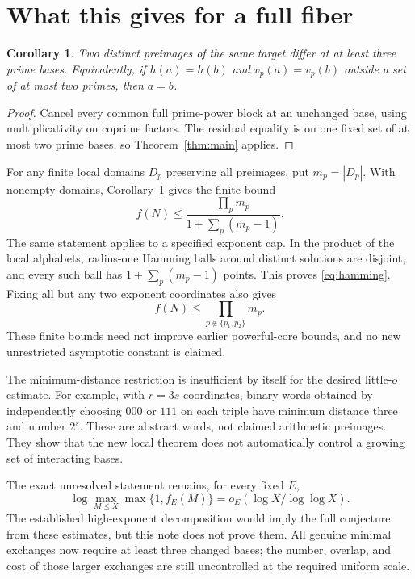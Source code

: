 \documentclass[11pt]{article}
\newtheorem{corollary}[theorem]{Corollary}
\begin{document}
\section{What this gives for a full fiber}
\begin{corollary}\label{cor:distance}
Two distinct preimages of the same target differ at at least three prime bases. Equivalently, if $h(a)=h(b)$ and $v_p(a)=v_p(b)$ outside a set of at most two primes, then $a=b$.
\end{corollary}
\begin{proof}
Cancel every common full prime-power block at an unchanged base, using multiplicativity on coprime factors. The residual equality is on one fixed set of at most two prime bases, so Theorem~\ref{thm:main} applies.
\end{proof}

For any finite local domains $D_p$ preserving all preimages, put $m_p=|D_p|$. With nonempty domains, Corollary~\ref{cor:distance} gives the finite bound
\begin{equation}\label{eq:hamming}
 \boxed{f(N)\le\frac{\prod_p m_p}{1+\sum_p(m_p-1)}.}
\end{equation}
The same statement applies to a specified exponent cap. In the product of the local alphabets, radius-one Hamming balls around distinct solutions are disjoint, and every such ball has $1+\sum_p(m_p-1)$ points. This proves \eqref{eq:hamming}. Fixing all but any two exponent coordinates also gives
\[
 f(N)\le\prod_{p\notin\{p_1,p_2\}}m_p.
\]
These finite bounds need not improve earlier powerful-core bounds, and no new unrestricted asymptotic constant is claimed.

The minimum-distance restriction is insufficient by itself for the desired little-$o$ estimate. For example, with $r=3s$ coordinates, binary words obtained by independently choosing $000$ or $111$ on each triple have minimum distance three and number $2^s$. These are abstract words, not claimed arithmetic preimages. They show that the new local theorem does not automatically control a growing set of interacting bases.

The exact unresolved statement remains, for every fixed $E$,
\[
 \log\max_{M\le X}\max\{1,f_E(M)\}
 =o_E(\log X/\log\log X).
\]
The established high-exponent decomposition would imply the full conjecture from these estimates, but this note does not prove them. All genuine minimal exchanges now require at least three changed bases; the number, overlap, and cost of those larger exchanges are still uncontrolled at the required uniform scale.
\end{document}

